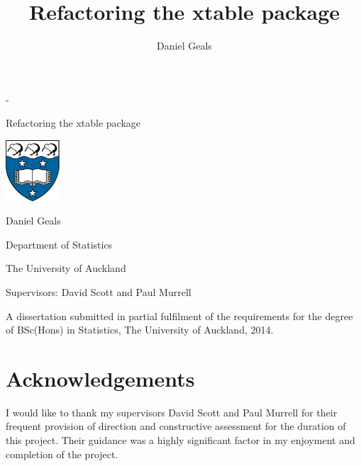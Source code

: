 \documentclass{memoir}\usepackage[]{graphicx}\usepackage[]{color}
\title{Refactoring the xtable package}
\author{Daniel Geals}
\makeatletter
\newlength\drop
\newcommand*{\titleGM}{%
\thispagestyle{empty}
\begingroup%
\drop = 0.1\textheight
\vspace*{\baselineskip}
\vfill
\hbox{%
  \hspace*{0.2\textwidth}%
  \rule{1pt}{\dimexpr\textheight-28pt\relax}%
  \hspace*{0.05\textwidth}%
  \parbox[b]{0.75\textwidth}{%
    \vbox{%
      \vspace{\drop}
      {\Huge\bfseries\raggedright\@title\par}\vskip2.37\baselineskip
      {\Large\bfseries\@author\par}
      \vspace{0.5\textheight}
    }%
  }%
}%
\vfill
\null
\endgroup}
\makeatother
\begin{document}
\frontmatter
\pagestyle{empty}

\calccentering{\unitlength}                         %
\begin{adjustwidth*}{\unitlength}{-\unitlength}     %
    \begin{adjustwidth}{-1cm}{-1cm}
\begin{center}
\vspace{1cm}

{\Huge         Refactoring the xtable package}

\vspace{35mm} 

\includegraphics[width=2cm]{logo}

 \vspace{45mm}

{\Large       Daniel Geals}

  \vspace{1ex}

Department of Statistics

The University of Auckland

  \vspace{5ex}

Supervisors: David Scott and Paul Murrell            

  \vspace{30mm}

A dissertation submitted in partial fulfilment of the requirements for the degree of BSc(Hons)  in Statistics, The University of Auckland, 2014.
\end{center}
   \end{adjustwidth}
\end{adjustwidth*}






\chapter*{Acknowledgements}
I would like to thank my supervisors David Scott and Paul Murrell for their frequent provision of direction and constructive assessment for the duration of this project. Their guidance was a highly significant factor in my enjoyment and completion of the project.
\end{document}
